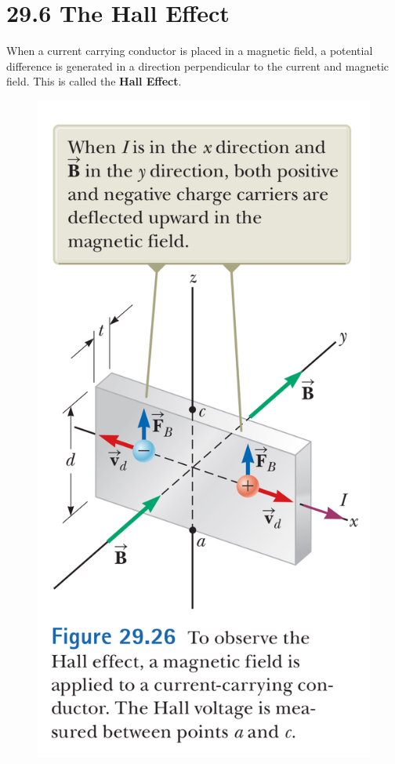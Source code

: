 \documentclass[12pt, titlepage, oneside]{article}
\begin{document}
\section*{29.6 The Hall Effect}
When a current carrying conductor is placed in a magnetic field, a potential difference is generated in a direction perpendicular to the current and magnetic field. This is called the \textbf{Hall Effect}. \\

\begin{figure}
	\begin{center}
		\includegraphics[scale=.33]{5.png}
	\end{center}
\end{figure}
\end{document}

